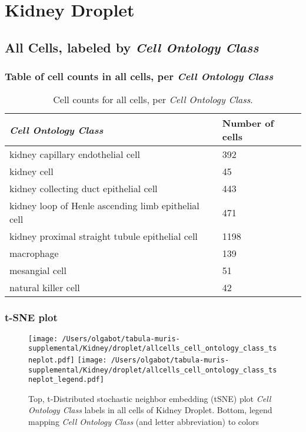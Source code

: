 \clearpage
\section{Kidney Droplet}

\subsection{All Cells, labeled by \emph{Cell Ontology Class}}
\subsubsection{Table of cell counts in all cells, per \emph{Cell Ontology Class}}\begin{table}[h]
\centering
\label{my-label}
\begin{tabular}{@{}ll@{}}
\toprule

\emph{Cell Ontology Class}& Number of cells \\ \midrule
kidney capillary endothelial cell & 392 \\

kidney cell & 45 \\

kidney collecting duct epithelial cell & 443 \\

kidney loop of Henle ascending limb epithelial cell & 471 \\

kidney proximal straight tubule epithelial cell & 1198 \\

macrophage & 139 \\

mesangial cell & 51 \\

natural killer cell & 42 \\
\bottomrule
\end{tabular}
\caption{Cell counts for all cells, per \emph{Cell Ontology Class}.}
\end{table}

\clearpage
\subsubsection{t-SNE plot}
\begin{figure}[h]
\centering
\texttt{[image: /Users/olgabot/tabula-muris-supplemental/Kidney/droplet/allcells\_cell\_ontology\_class\_tsneplot.pdf]}
\texttt{[image: /Users/olgabot/tabula-muris-supplemental/Kidney/droplet/allcells\_cell\_ontology\_class\_tsneplot\_legend.pdf]}
\caption{Top, t-Distributed stochastic neighbor embedding (tSNE) plot  \emph{Cell Ontology Class} labels in all cells of Kidney Droplet. Bottom, legend mapping \emph{Cell Ontology Class} (and letter abbreviation) to colors}
\end{figure}


